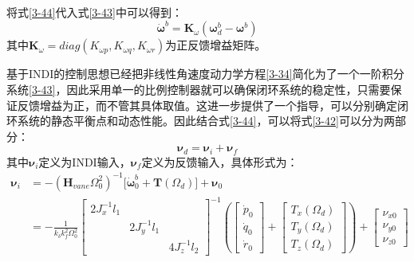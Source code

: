 将式\eqref{3-44}代入式\eqref{3-43}中可以得到：
\begin{equation}
    \dot{\boldsymbol \omega}^b=\boldsymbol{K}_{\omega}(\boldsymbol{\omega}_d^b-\boldsymbol{\omega}^b)
    \label{3-45}
\end{equation}
其中$\boldsymbol{K}_\omega=diag({K}_{\omega p},{K}_{\omega q},{K}_{\omega r})$为正反馈增益矩阵。

基于INDI的控制思想已经把非线性角速度动力学方程\eqref{3-34}简化为了一个一阶积分系统\eqref{3-43}，因此采用单一的比例控制器就可以确保闭环系统的稳定性，只需要保证反馈增益为正，而不管其具体取值。这进一步提供了一个指导，可以分别确定闭环系统的静态平衡点和动态性能。因此结合式\eqref{3-44}，可以将式\eqref{3-42}可以分为两部分：
\begin{equation}
    \boldsymbol{\nu}_d=\boldsymbol{\nu}_i + \boldsymbol{\nu}_f
    \label{3-46}
\end{equation}
其中$\boldsymbol{\nu}_i$定义为INDI输入，$\boldsymbol{\nu}_f$定义为反馈输入，具体形式为：
\begin{equation}
    \begin{aligned}
        \boldsymbol{\nu}_i&=-(\boldsymbol{H}_{vane}\Omega_0^2)^{-1} \big[\boldsymbol{\dot{\omega}}_0^b+\boldsymbol{T}(\Omega_d)\big]+\boldsymbol{\nu}_0\\
        &=-\frac{1}{k_{\delta}k_f^2\Omega_0^2}
        \left[\begin{array}{ccc}2J_x^{-1}l_1 & & \\& 2J_y^{-1}l_1 & \\& & 4J_z^{-1}l_2\end{array}\right]^{-1}
        \left (\begin{bmatrix}\dot{p}_0 \\ \dot{q}_0 \\ \dot{r}_0 \end{bmatrix}+\begin{bmatrix}T_{x}(\Omega_d) \\ T_{y}(\Omega_d) \\ T_{z}(\Omega_d)
        \end{bmatrix}\right )
        +  \begin{bmatrix}\nu_{x0} \\ \nu_{y0} \\ \nu_{z0}\end{bmatrix}
    \end{aligned}
    \label{3-47}
\end{equation}
